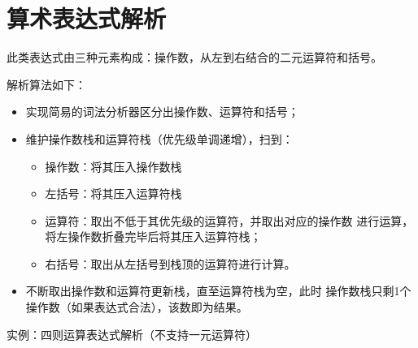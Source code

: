 \section{算术表达式解析}
此类表达式由三种元素构成：操作数，从左到右结合的二元运算符和括号。

解析算法如下：
\begin{itemize}
	\item 实现简易的词法分析器区分出操作数、运算符和括号；
	\item 维护操作数栈和运算符栈（优先级单调递增），扫到：
	      \begin{itemize}
		      \item 操作数：将其压入操作数栈
		      \item 左括号：将其压入运算符栈
		      \item 运算符：取出不低于其优先级的运算符，并取出对应的操作数
		            进行运算，将左操作数折叠完毕后将其压入运算符栈；
		      \item 右括号：取出从左括号到栈顶的运算符进行计算。
	      \end{itemize}
	\item 不断取出操作数和运算符更新栈，直至运算符栈为空，此时
	      操作数栈只剩1个操作数（如果表达式合法），该数即为结果。
\end{itemize}

实例：四则运算表达式解析（不支持一元运算符）

